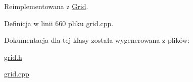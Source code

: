 Reimplementowana z \hyperlink{class_grid_ac0cf78c28206fd44fba21c5a91d0a0e0}{Grid}.



Definicja w linii 660 pliku grid.\+cpp.



Dokumentacja dla tej klasy została wygenerowana z plików\+:\begin{DoxyCompactItemize}
\item 
\hyperlink{grid_8h}{grid.\+h}\item 
\hyperlink{grid_8cpp}{grid.\+cpp}\end{DoxyCompactItemize}
